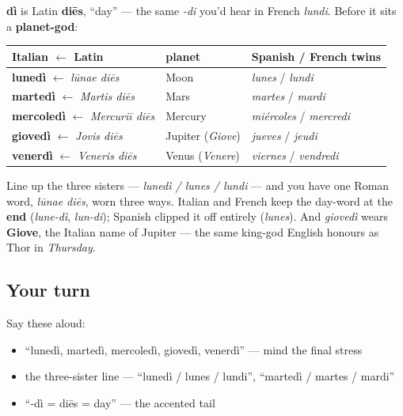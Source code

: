 \begin{grammarlens}[title={Grammar Lens: {[}planet{]} + dì}]
\textbf{dì} is Latin \textbf{diēs}, \textquotedblleft{}day\textquotedblright{} — the same \emph{-di} you'd hear in French \emph{lundi}. Before it sits a \textbf{planet-god}:

\noindent
\begin{tabularx}{\linewidth}{@{}>{\raggedright\arraybackslash}X>{\raggedright\arraybackslash}X>{\raggedright\arraybackslash}X@{}}
\toprule
\textbf{Italian $\leftarrow$ Latin} & \textbf{planet} & \textbf{Spanish / French twins} \\
\midrule
\textbf{lunedì} $\leftarrow$ \emph{lūnae diēs} & Moon & \emph{lunes} / \emph{lundi} \\
\textbf{martedì} $\leftarrow$ \emph{Martis diēs} & Mars & \emph{martes} / \emph{mardi} \\
\textbf{mercoledì} $\leftarrow$ \emph{Mercuriī diēs} & Mercury & \emph{miércoles} / \emph{mercredi} \\
\textbf{giovedì} $\leftarrow$ \emph{Jovis diēs} & Jupiter (\emph{Giove}) & \emph{jueves} / \emph{jeudi} \\
\textbf{venerdì} $\leftarrow$ \emph{Veneris diēs} & Venus (\emph{Venere}) & \emph{viernes} / \emph{vendredi} \\
\bottomrule
\end{tabularx}

Line up the three sisters — \emph{lunedì / lunes / lundi} — and you have one Roman word, \emph{lūnae diēs}, worn three ways. Italian and French keep the day-word at the \textbf{end} (\emph{lune-dì}, \emph{lun-di}); Spanish clipped it off entirely (\emph{lunes}). And \emph{giovedì} wears \textbf{Giove}, the Italian name of Jupiter — the same king-god English honours as Thor in \emph{Thursday}.
\end{grammarlens}

\subsection*{Your turn}
Say these aloud:

\begin{itemize}
\raggedright
  \item \textquotedblleft{}lunedì, martedì, mercoledì, giovedì, venerdì\textquotedblright{} — mind the final stress
  \item the three-sister line — \textquotedblleft{}lunedì / lunes / lundi\textquotedblright{}, \textquotedblleft{}martedì / martes / mardi\textquotedblright{}
  \item \textquotedblleft{}-dì = diēs = day\textquotedblright{} — the accented tail
\end{itemize}

